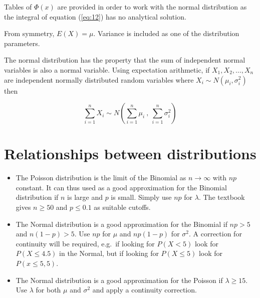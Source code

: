 \documentclass[a5paper]{article}
\begin{document}
Tables of $\Phi(x)$ are provided in order to work with the normal distribution
as the integral of equation (\ref{eq:12}) has no analytical solution.

From symmetry, $E(X)=\mu$. Variance is included as one of the distribution
parameters.

The normal distribution has the property that the sum of independent normal
variables is also a normal variable. Using expectation arithmetic, if $X_1, X_2,
\ldots, X_n$ are independent normally distributed random variables where
$X_i\sim N(\mu_i, \sigma_i^2)$ then

\begin{equation}
  \sum_{i=1}^{n}X_i \sim N\left(\sum_{i=1}^{n}\mu_i\ ,\ \sum_{i=1}^{n}\sigma_i^2\right)
\end{equation}

\section{Relationships between distributions}
\begin{itemize}
\item The Poisson distribution is the limit of the Binomial as
  $n\rightarrow\infty$ with $np$ constant. It can thus used as a good
  approximation for the Binomial distribution if $n$ is large and $p$ is small.
  Simply use $np$ for $\lambda$.
  The textbook gives \mbox{$n\ge 50$} and $p\le 0.1$ as suitable cutoffs.
\item The Normal distribution is a good approximation for the Binomial if $np>5$
  and $n(1-p)>5$. Use $np$ for $\mu$ and $np(1-p)$ for $\sigma^2$. A correction
  for continuity will be required, e.g.\ if looking for \mbox{$P(X<5)$} look for $P(X\le
  4.5)$ in the Normal, but if looking for $P(X\le5)$ look for $P(x\le 5,5)$.
\item The Normal distribution is a good approximation for the Poisson if
  $\lambda\ge 15$. Use $\lambda$ for both $\mu$ and $\sigma^2$ and apply a
  continuity correction.
\end{itemize}
\end{document}
